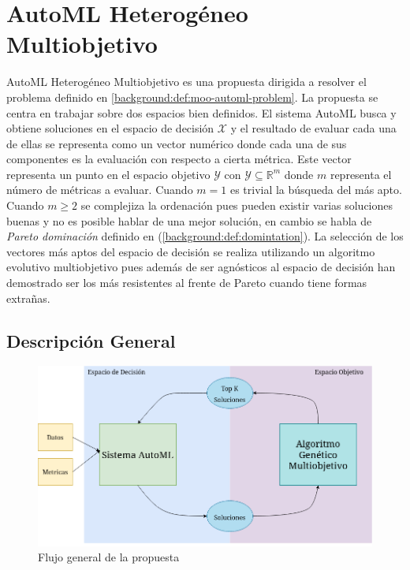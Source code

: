 
\chapter{AutoML Heterog\'eneo Multiobjetivo}\label{chapter:proposal}

AutoML Heterog\'eneo Multiobjetivo es una propuesta dirigida a resolver el problema definido en \ref{background:def:moo-automl-problem}. La propuesta se centra en trabajar sobre dos espacios bien definidos. El sistema AutoML busca y obtiene soluciones en el espacio de decisi\'on $\mathcal{X}$ y el resultado  de evaluar cada una de ellas se representa como un vector num\'erico donde cada una de sus componentes es la evaluaci\'on con respecto a cierta m\'etrica. Este vector representa un punto en el espacio objetivo $\mathcal{Y}$ con $\mathcal{Y} \subseteq \mathbb{R}^m$ donde $m$ representa el n\'umero de m\'etricas a evaluar. Cuando $m = 1$ es trivial la b\'usqueda del m\'as apto. Cuando $m \ge 2$ se complejiza la ordenaci\'on pues pueden existir varias soluciones buenas y no es posible hablar de una mejor soluci\'on, en cambio se habla de \textit{Pareto dominaci\'on} definido en (\ref{background:def:domintation}). La selecci\'on de los vectores  m\'as aptos del espacio de decisi\'on se realiza utilizando un algoritmo evolutivo multiobjetivo pues adem\'as de ser agn\'osticos al espacio de decisi\'on han demostrado ser los m\'as resistentes al frente de Pareto cuando tiene formas extra\~nas.

\section{Descripci\'on General}
\begin{figure}[ht]
    \centering
    \includegraphics[scale=0.4]{Pictures/automl_moo_proposal2.png}
    \caption{Flujo general de la propuesta}
    \label{proposal:fig:flux}
\end{figure}

